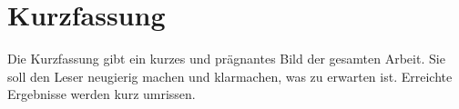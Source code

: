 

\section*{Kurzfassung}
Die Kurzfassung gibt  ein kurzes und prägnantes Bild der  gesamten Arbeit. Sie soll
den  Leser  neugierig  machen  und  klarmachen,  was  zu  erwarten  ist.  Erreichte
Ergebnisse werden kurz umrissen.

